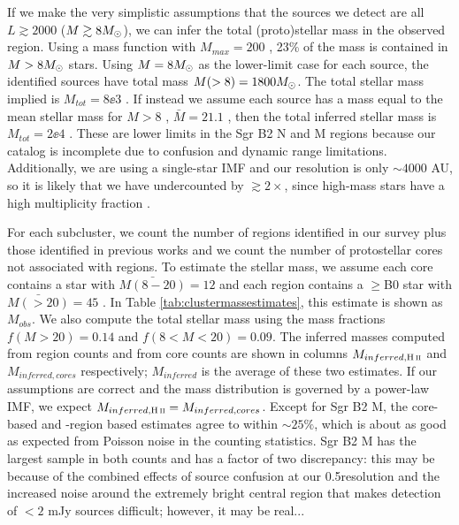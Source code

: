 \documentclass[twocolumn]{aastex61}
\begin{document}
If we make the very simplistic assumptions that the sources we detect are all
$L\gtrsim2000$ \lsun ($M\gtrsim8 M_{\odot}$), we can infer the total (proto)stellar
mass in the observed region.  Using a \citet{Kroupa2001a} mass function with
$M_{max}=200$ \msun, 23\% of the mass is contained in $M>8M_{\odot}$ stars.  Using
$M=8M_{\odot}$ as the lower-limit case for each source, the identified sources have
total mass $M(>8)=1800M_{\odot}$.  The total stellar mass implied is $M_{tot} =
8\ee{3}$ \msun.  If instead we assume each source has a mass equal to the mean
stellar mass for $M>8$ \msun, $\bar{M}=21.1$ \msun, then the total inferred
stellar mass is $M_{tot}=2\ee{4}$ \msun.  These are lower limits in the Sgr B2
N and M regions because our catalog is incomplete due to confusion and dynamic
range limitations.  Additionally, we are using a single-star IMF and our
resolution is only $\sim4000$ AU, so it is likely that we have undercounted by
$\gtrsim2\times$, since high-mass stars have a high multiplicity fraction
\citep{Mason2009a}.


For each subcluster, we count the number of \hii regions identified in our
survey plus those identified in previous works \citep{de-Pree1996a} and
we count the number of protostellar cores not associated with \hii regions.
To estimate the stellar mass, we assume each core contains a star
with $\bar{M(8-20)} = 12$ \msun and each \hii region contains a $\geq$B0 star
with $\bar{M(>20)} = 45$ \msun.  In Table \ref{tab:clustermassestimates},
this estimate is shown as $M_{obs}$.  We also compute the total stellar
mass using the mass fractions $f(M>20) = 0.14$ and $f(8<M<20)=0.09$.
The inferred masses computed from \hii region counts and from core
counts are shown in columns $M_{inferred,\hii}$ and $M_{inferred,cores}$
respectively; $M_{inferred}$ is the average of these two estimates.
If our assumptions are correct and the mass distribution is governed
by a power-law IMF, we expect $M_{inferred,\hii} = M_{inferred,cores}$.
Except for Sgr B2 M, the core-based and \hii-region based estimates agree
to within $\sim25\%$, which is about as good as expected from Poisson
noise in the counting statistics.  Sgr B2 M has the largest sample in both
counts and has a factor of two discrepancy: this may be because of the
combined effects of source confusion at our 0.5\arcsec resolution and the
increased noise around the extremely bright central region that makes detection
of $<2$ mJy sources difficult; however, it may be real...
\end{document}
